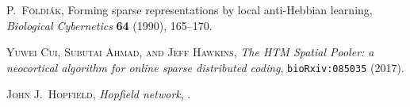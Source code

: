 \documentclass[titlepage]{amsart}
\theoremstyle{definition}
\begin{document}
\begin{thebibliography}{14}



\textsc{P.\ F\"oldi\'ak},
Forming sparse representations by local anti-Hebbian learning,
\textit{Biological Cybernetics} \textbf{64} (1990), 165--170.


\textsc{Yuwei Cui, Subutai Ahmad, and Jeff Hawkins},
\textit{The HTM Spatial Pooler: a neocortical algorithm for online sparse distributed coding},
\texttt{bioRxiv:085035} (2017).


\textsc{John J.\ Hopfield},
\textit{Hopfield network},
.


\end{thebibliography}
%

\end{document}
